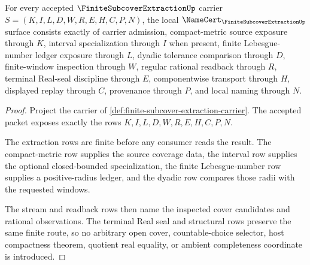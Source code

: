\begin{theorem}
\label{thm:finite-subcover-extraction-namecert-obligations}
For every accepted $\FiniteSubcoverExtractionUp$ carrier $S=(K,I,L,D,W,R,E,H,C,P,N)$, the local $\NameCert_{\FiniteSubcoverExtractionUp}$ surface consists exactly of carrier admission, compact-metric source exposure through $K$, interval specialization through $I$ when present, finite Lebesgue-number ledger exposure through $L$, dyadic tolerance comparison through $D$, finite-window inspection through $W$, regular rational readback through $R$, terminal Real-seal discipline through $E$, componentwise transport through $H$, displayed replay through $C$, provenance through $P$, and local naming through $N$.
\end{theorem}
\begin{proof}
Project the carrier of \autoref{def:finite-subcover-extraction-carrier}. The accepted packet exposes exactly the rows $K,I,L,D,W,R,E,H,C,P,N$.

The extraction rows are finite before any consumer reads the result. The compact-metric row supplies the source coverage data, the interval row supplies the optional closed-bounded specialization, the finite Lebesgue-number row supplies a positive-radius ledger, and the dyadic row compares those radii with the requested windows.

The stream and readback rows then name the inspected cover candidates and rational observations. The terminal Real seal and structural rows preserve the same finite route, so no arbitrary open cover, countable-choice selector, host compactness theorem, quotient real equality, or ambient completeness coordinate is introduced.
\end{proof}

